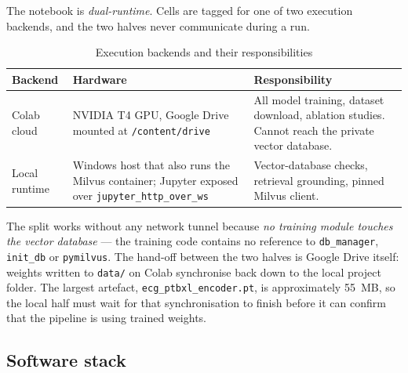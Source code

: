 \documentclass[11pt,a4paper]{article}
\newcommand{\code}[1]{\texttt{\small #1}}
\begin{document}
The notebook is \emph{dual-runtime}. Cells are tagged for one of two
execution backends, and the two halves never communicate during a run.

\begin{table}[!ht]
\centering
\caption{Execution backends and their responsibilities}
\label{tab:runtime}
\small
\begin{tabular}{@{}p{3.2cm}p{5.3cm}p{6.6cm}@{}}
\toprule
\textbf{Backend} & \textbf{Hardware} & \textbf{Responsibility}\\
\midrule
Colab cloud & NVIDIA T4 GPU, Google Drive mounted at
\code{/content/drive} &
All model training, dataset download, ablation studies. Cannot reach the
private vector database.\\
\addlinespace
Local runtime & Windows host that also runs the Milvus container;
Jupyter exposed over \code{jupyter\_http\_over\_ws} &
Vector-database checks, retrieval grounding, pinned Milvus client.\\
\bottomrule
\end{tabular}
\end{table}

The split works without any network tunnel because \emph{no training
module touches the vector database} --- the training code contains no
reference to \code{db\_manager}, \code{init\_db} or \code{pymilvus}. The
hand-off between the two halves is Google Drive itself: weights written to
\code{data/} on Colab synchronise back down to the local project folder.
The largest artefact, \code{ecg\_ptbxl\_encoder.pt}, is approximately
55~MB, so the local half must wait for that synchronisation to finish
before it can confirm that the pipeline is using trained weights.

\subsection{Software stack}
\end{document}
